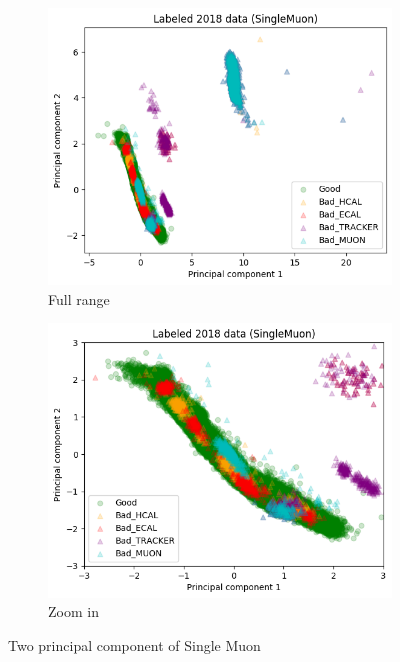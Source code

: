 \begin{figure}[h!]
\begin{subfigure}[b]{0.49\linewidth}
        \includegraphics[width=\linewidth]{images/reco/2018/SingleMuon_subsystem_label.png}
        \caption{Full range}
    \end{subfigure}
    \begin{subfigure}[b]{0.49\linewidth}
        \includegraphics[width=\linewidth]{images/reco/2018/SingleMuon_subsystem_label_short_range.png}
        \caption{Zoom in}
    \end{subfigure}
    \caption{Two principal component of Single Muon}
\label{fig:2018_SingleMuon_subsystem_label}
\end{figure}


